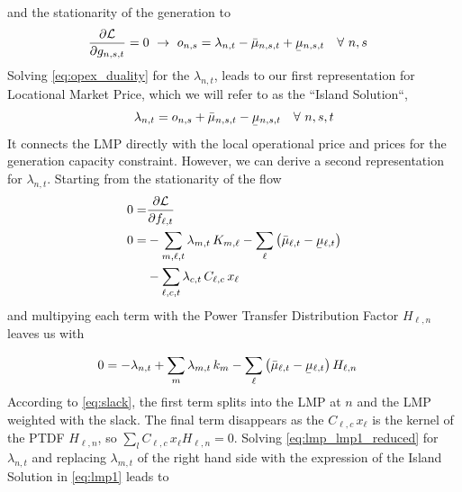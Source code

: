 \documentclass[11pt,twocolumn]{article}
\newcommand{\ubar}[1]{\underaccent{\bar}{#1}}
\newcommand{\generation}[1][n]{g_{#1,s,t}}
\newcommand{\opexGeneration}[1][n]{o_{#1,s}}
\newcommand{\incidence}[1][n]{K_{#1,\ell}}
\newcommand{\ptdf}[1][n]{H_{\ell,#1}}
\newcommand{\slack}[1][n]{k_{#1}}
\newcommand{\mulowergeneration}[1][n]{\ubar{\mu}_{#1,s,t}}
\newcommand{\muuppergeneration}[1][n]{\bar{\mu}_{#1,s,t}}
\newcommand{\mulowerflow}{\ubar{\mu}_{\ell,t}}
\newcommand{\muupperflow}{\bar{\mu}_{\ell,t}}
\newcommand{\lmp}[1][n]{\lambda_{#1,t}}
\newcommand{\flow}{f_{\ell,t}}
\newcommand{\cycle}{C_{\ell,c}}
\newcommand{\impedance}{x_\ell}
\newcommand{\cycleprice}{\lambda_{c,t}}
\newcommand{\lagrangian}{\mathcal{L}}
\newcommand{\Forall}[1]{\hspace{10pt} \forall \,\, #1 }
\newcommand{\pdv}[2]{\frac{\partial #1}{\partial #2}}
\begin{document}
and the stationarity of the generation to 
\begin{align}
 \pdv{\lagrangian}{\generation} &= 0 \,\, \rightarrow \,\,  
 \opexGeneration =  \lmp - \muuppergeneration + \mulowergeneration \Forall{n,s} \label{eq:opex_duality}
\end{align}
Solving \cref{eq:opex_duality} for the $\lmp$, leads to our first representation for Locational Market Price, which we will refer to as the ``Island Solution``,
\begin{align}
\lmp  =  \opexGeneration + \muuppergeneration - \mulowergeneration \Forall{n,s,t}
\label{eq:lmp1}
\end{align}
It connects the LMP directly with the local operational price and prices for the generation capacity constraint. However, we can derive a second representation for $\lmp$. Starting from the stationarity of the flow
\begin{align}
 0 =& \pdv{\lagrangian}{\flow}  \\
 \notag
 0 =& - \sum_{m,\ell,t} \lmp[m] \, \incidence[m]  - \sum_{\ell} \left( \muupperflow - \mulowerflow \right)  \\
 & -\sum_{\ell,c,t} \cycleprice \, \cycle \, \impedance
\end{align}
and multipying each term with the Power Transfer Distribution Factor $\ptdf$ leaves us with  

\begin{align}
  0 &= - \lmp + \sum_m \lmp[m] \, \slack[m]  - \sum_{\ell} \left( \muupperflow - \mulowerflow \right) \ptdf
  \label{eq:lmp_lmp1_reduced}
\end{align}
According to \cref{eq:slack}, the first term splits into the LMP at $n$ and the LMP weighted with the slack. The final term disappears as the $\cycle \, \impedance$ is the kernel of the PTDF $\ptdf$, so $\sum_l \cycle \, \impedance \ptdf = 0$. Solving \cref{eq:lmp_lmp1_reduced} for $\lmp$ and replacing $\lmp[m]$ of the right hand side with the expression of the Island Solution in \cref{eq:lmp1} leads to 
\end{document}
